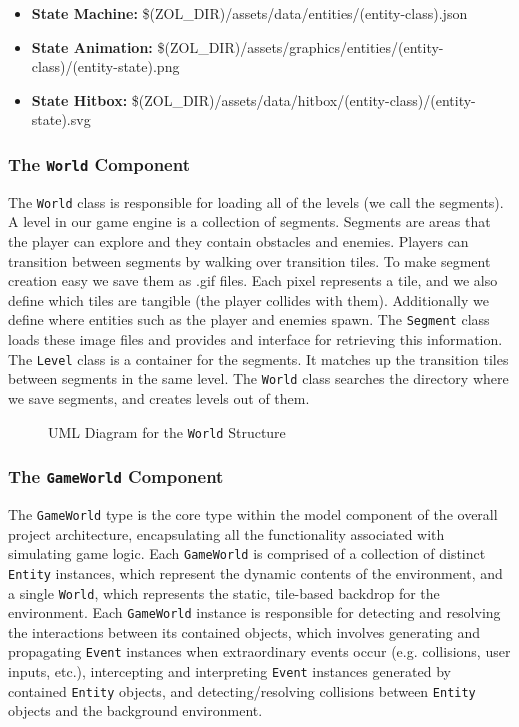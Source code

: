 \documentclass{article}
\newcommand{\classname}[1] {\texttt{#1}}
\newcommand{\insertdiagram}[2]
{
	\begin{figure}[H]
		\centering
		\fbox{\texttt{[image: figures/\#1]}}
		\caption{UML Diagram for the \classname{#1} Structure}
	\end{figure}
}
\begin{document}
			\begin{itemize}
				\item \textbf{State Machine:} \$(ZOL\_DIR)/assets/data/entities/(entity-class).json
				\item \textbf{State Animation:} \$(ZOL\_DIR)/assets/graphics/entities/(entity-class)/(entity-state).png
				\item \textbf{State Hitbox:} \$(ZOL\_DIR)/assets/data/hitbox/(entity-class)/(entity-state).svg
			\end{itemize}

			\subsubsection[\classname{World}]{The \classname{World} Component}
			The \classname{World} class is responsible for loading all of the levels (we call the segments). 
			A level in our game engine is a collection of segments. Segments are areas that the 
			player can explore and they contain obstacles and enemies. Players can transition between 
			segments by walking over transition tiles. To make segment creation easy we save them as 
			.gif files. Each pixel represents a tile, and we also define which tiles are tangible 
			(the player collides with them). Additionally we define where entities such as the player 
			and enemies spawn. The \classname{Segment} class loads these image files and provides and interface 
			for retrieving this information. The \classname{Level} class is a container for the segments. It matches 
			up the transition tiles between segments in the same level. The \classname{World} class searches the 
			directory where we save segments, and creates levels out of them.

			\insertdiagram{World}{2.0in}

			\subsubsection[\classname{GameWorld}]{The \classname{GameWorld} Component}
			The \classname{GameWorld} type is the core type within the model
			component of the overall project architecture, encapsulating all
			the functionality associated with simulating game logic.  Each
			\classname{GameWorld} is comprised of a collection of distinct
			\classname{Entity} instances, which represent the dynamic contents
			of the environment, and a single \classname{World}, which represents
			the static, tile-based backdrop for the environment.  Each \classname{GameWorld} instance
			is responsible for detecting and resolving the interactions between
			its contained objects, which involves generating and propagating
			\classname{Event} instances when extraordinary events occur (e.g.
			collisions, user inputs, etc.), intercepting and interpreting
			\classname{Event} instances generated by contained \classname{Entity}
			objects, and detecting/resolving collisions between \classname{Entity}
			objects and the background environment.
\end{document}
